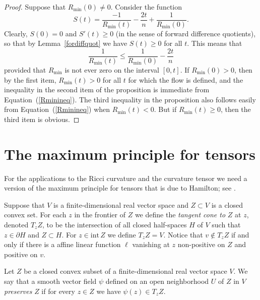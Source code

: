 \begin{proof}
Suppose that $R_\mathrm{min}(0)\not= 0$.
 Consider the function
$$S(t)=\frac{-1}{R_\mathrm{min}(t)}-\frac{2t}{n}+\frac{1}{R_\mathrm{min}(0)}.$$
 Clearly, $S(0)=0$ and $S'(t)\ge 0$ (in the sense of forward difference quotients),
  so that by  Lemma~\ref{fordiffquot} we have $S(t)\ge 0$ for all $t$. This means that
\begin{equation}\label{Rminineq} \frac{1}{R_\mathrm{min}(t)}\le
\frac{1}{R_\mathrm{min}(0)}-\frac{2t}{n}\end{equation} provided that
$R_\mathrm{min}$ is not ever zero on the interval $[0,t]$. If $R_\mathrm{min}(0)>0$, then by the first item, $R_\mathrm{min}(t)>0$ for all $t$
for which the flow is defined, and the inequality in the second item
of the proposition is immediate from Equation~(\ref{Rminineq}). The
third inequality in the proposition also follows easily from
Equation~(\ref{Rminineq}) when $R_\mathrm{min}(t)<0$. But if $R_\mathrm{min}(t)\ge 0$, then the third item is obvious.
\end{proof}




\section{The maximum principle for tensors}

For the applications to the
Ricci curvature and the curvature tensor we need a version of the
maximum principle for tensors that is due to Hamilton; see
\cite{Hamilton4MPCO}.

Suppose that $V$ is a finite-dimensional real vector space and $Z\subset V$ is
a closed convex set. For each $z$ in the frontier of $ Z$ we define the {\em
tangent cone to} $Z$ at $z$, denoted $T_zZ$, to be the intersection of all
closed half-spaces $H$ of $V$ such that $z\in
\partial H$ and $Z\subset H$. For $z\in \mathrm{int}\, Z$ we define
$T_zZ=V$. Notice that $v\notin T_zZ$ if and only if there is a
affine linear function $\ell$ vanishing at $z$ non-positive on $Z$
and positive on $v$.

\begin{definition}
\label{def:vector-field-preserves-convex-set}
Let $Z$ be a closed convex subset of a finite-dimensional real vector space
$V$. We say that a smooth vector field $\psi$ defined on an open neighborhood
$U$ of $Z$ in $V$ {\em preserves} $Z$ if for every $z\in Z$ we have $\psi(z)\in
T_zZ$.
\end{definition}

